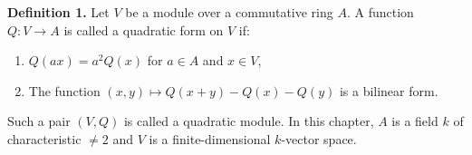\textbf{Definition 1.} Let $V$ be a module over a commutative ring $A$. A function $Q: V \to A$ is called a quadratic form on $V$ if:
\begin{enumerate}
\item[(1)] $Q(ax) = a^2 Q(x)$ for $a \in A$ and $x \in V$,
\item[(2)] The function $(x,y) \mapsto Q(x+y) - Q(x) - Q(y)$ is a bilinear form.
\end{enumerate}
Such a pair $(V,Q)$ is called a quadratic module. In this chapter, $A$ is a field $k$ of characteristic $\neq 2$ and $V$ is a finite-dimensional $k$-vector space.
